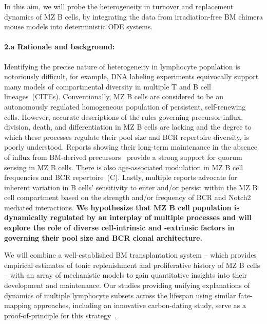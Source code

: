 \documentclass[11pt]{article}
\newcommand{\para}[1]{\vspace*{-4.5mm}\paragraph{#1}}
\begin{document}
In this aim, we will probe the heterogeneity in  turnover and replacement dynamics of MZ B cells, by integrating the data from irradiation-free BM chimera mouse models into deterministic ODE systems.


\para{{2.a Rationale and background:}}
Identifying the precise nature of heterogeneity in lymphocyte population is notoriously difficult, for example, DNA labeling experiments equivocally support many models of compartmental diversity in multiple  T and B cell lineages~(CITEs).
Conventionally, MZ B cells are considered to be an autonomously regulated homogeneous population of persistent, self-renewing cells. 
However, accurate descriptions of the rules governing precursor-influx, division, death, and differentiation in MZ B cells are lacking and the degree to which these processes regulate their pool size and BCR repertoire diversity, is poorly understood. 
Reports showing their long-term maintenance in the absence of influx from BM-derived precursors~\cite{Carvalho_2001, Hao_2001} provide a strong support for quorum sensing in MZ B cells.   
There is also age-associated modulation in MZ B cell frequencies and BCR repertoire~\cite{Birjandi_2011, Cortegano_2017}(C).
Lastly, multiple reports advocate for inherent variation in B cells' sensitivity to enter and/or persist within the MZ B cell compartment based on the strength and/or frequency of BCR and Notch2 mediated interactions. %
\textbf{We hypothesize that MZ B cell population is dynamically regulated by an interplay of multiple processes and will explore the role of diverse cell-intrinsic and -extrinsic factors in governing their pool size and BCR clonal architecture.
}

We will combine a well-established BM transplantation system -- which provides empirical estimates of tonic replenishment and proliferative history of MZ B cells -- with an array of mechanistic models to gain quantitative insights into their development and maintenance.
Our studies providing unifying explanations of dynamics of multiple lymphocyte subsets across the lifespan using similar fate-mapping approaches, including an innovative carbon-dating study, serve as a proof-of-principle for this strategy~\cite{Rane_2018, Mold_2019, Verheijen_2020, Rane_2022}.
\end{document}
